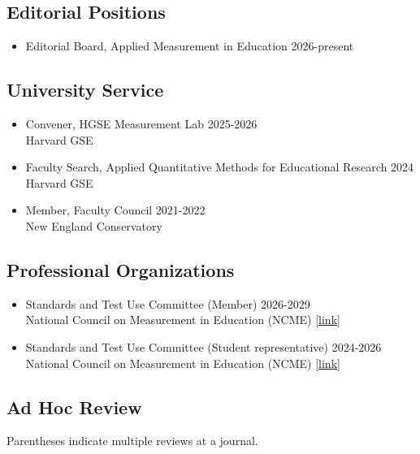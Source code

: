 \documentclass[11pt]{article}
\begin{document}
\subsection{Editorial Positions}

\begin{itemize}
    \item Editorial Board, Applied Measurement in Education \hfill 2026-present
\end{itemize}

\subsection{University Service}

\begin{itemize}
    \item Convener, HGSE Measurement Lab \hfill 2025-2026 \\ Harvard GSE
    \item Faculty Search, Applied Quantitative Methods for Educational Research \hfill 2024 \\ Harvard GSE
    \item Member, Faculty Council \hfill 2021-2022 \\ New England Conservatory
\end{itemize}

\subsection{Professional Organizations}

\begin{itemize}
    \item Standards and Test Use Committee (Member) \hfill 2026-2029 \\  National Council on Measurement in Education (NCME) [\href{https://www.ncme.org/community/ncme-committees/standard-test-use}{link}]
    \item Standards and Test Use Committee (Student representative) \hfill 2024-2026 \\  National Council on Measurement in Education (NCME) [\href{https://www.ncme.org/community/ncme-committees/standard-test-use}{link}]
\end{itemize}
 
\subsection{Ad Hoc Review}

Parentheses indicate multiple reviews at a journal. \\
\end{document}
